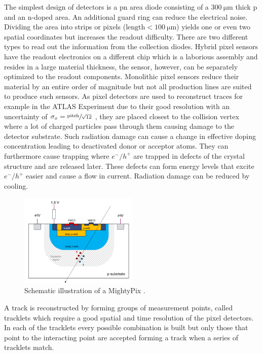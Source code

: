 The simplest design of detectors is a pn area diode consisting of a $\SI{300}{\micro\meter}$ thick p and an n-doped area. %
An additional guard ring can reduce the electrical noise.
Dividing the area into strips or pixels ($\text{length}<\SI{100}{\micro\meter}$) yields one or even two spatial coordinates but increases the readout difficulty.
There are two different types to read out the information from the collection diodes.
Hybrid pixel sensors have the readout electronics on a different chip which is a laborious assembly and resides in a large material thickness, the sensor, however, can be separately optimized to the readout components.
Monolithic pixel sensors reduce their material by an entire order of magnitude but not all production lines are suited to produce such sensors.
As pixel detectors are used to reconstruct traces for example in the ATLAS Experiment due to their good resolution with an uncertainty of $\sigma_x=\sfrac{\text{pitch}}{\sqrt{12}}$ \cite{Tom}, they are placed closest to the collision vertex where a lot of charged particles pass through them causing damage to the detector substrate.
Such radiation damage can cause a change in effective doping concentration leading to deactivated donor or acceptor atoms.
They can furthermore cause trapping where $e^-/h^+$ are trapped in defects of the crystal structure and are released later.
These defects can form energy levels that excite $e^-/h^+$ easier and cause a flow in current. %
Radiation damage can be reduced by cooling.
\begin{figure}
    \centering
    \includegraphics[width=0.5\textwidth]{figs/MightyPix.png}
    \caption{Schematic illustration of a MightyPix \cite{MightyPix}.}
    \label{fig:MightyPix}
\end{figure}
A track is reconstructed by forming groups of measurement points, called tracklets which require a good spatial and time resolution of the pixel detectors.
In each of the tracklets every possible combination is built but only those that point to the interacting point are accepted forming a track when a series of tracklets match.
